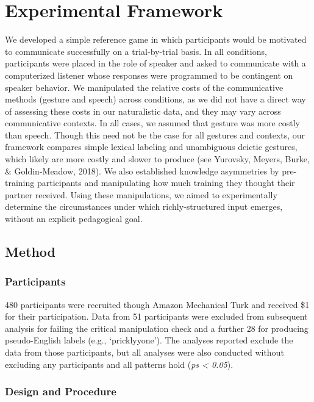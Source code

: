 \documentclass[10pt, letterpaper]{article}
\begin{document}
\section{Experimental Framework}\label{experimental-framework}

We developed a simple reference game in which participants would be
motivated to communicate successfully on a trial-by-trial basis. In all
conditions, participants were placed in the role of speaker and asked to
communicate with a computerized listener whose responses were programmed
to be contingent on speaker behavior. We manipulated the relative costs
of the communicative methods (gesture and speech) across conditions, as
we did not have a direct way of assessing these costs in our
naturalistic data, and they may vary across communicative contexts. In
all cases, we assumed that gesture was more costly than speech. Though
this need not be the case for all gestures and contexts, our framework
compares simple lexical labeling and unambiguous deictic gestures, which
likely are more costly and slower to produce (see Yurovsky, Meyers,
Burke, \& Goldin-Meadow, 2018). We also established knowledge
asymmetries by pre-training participants and manipulating how much
training they thought their partner received. Using these manipulations,
we aimed to experimentally determine the circumstances under which
richly-structured input emerges, without an explicit pedagogical goal.

\subsection{Method}\label{method}

\subsubsection{Participants}\label{participants}

480 participants were recruited though Amazon Mechanical Turk and
received \$1 for their participation. Data from 51 participants were
excluded from subsequent analysis for failing the critical manipulation
check and a further 28 for producing pseudo-English labels (e.g.,
`pricklyyone'). The analyses reported exclude the data from those
participants, but all analyses were also conducted without excluding any
participants and all patterns hold (\emph{ps \textless{} 0.05}).

\subsubsection{Design and Procedure}\label{design-and-procedure}
\end{document}
